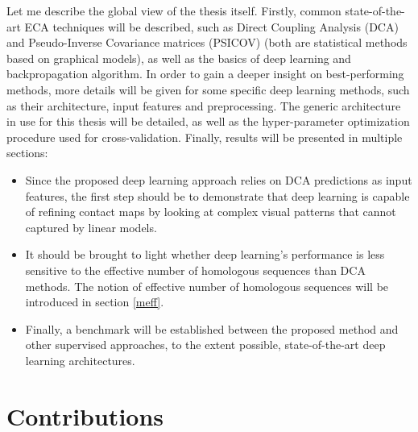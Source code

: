     Let me describe the global view of the thesis itself.
    Firstly, common state-of-the-art ECA techniques will be described, such as Direct Coupling Analysis (DCA)
    and Pseudo-Inverse Covariance matrices (PSICOV) (both are statistical methods based on graphical models),
    as well as the basics of deep learning and backpropagation algorithm.
    In order to gain a deeper insight on best-performing methods, more details will be given for
    some specific deep learning methods, such as their architecture, input features and preprocessing.
    The generic architecture in use for this thesis will be detailed, as well as the hyper-parameter
    optimization procedure used for cross-validation.
    Finally, results will be presented in multiple sections:
    \begin{itemize}
        \item Since the proposed deep learning approach relies on DCA predictions as input features,
        the first step should be to demonstrate that deep learning is capable of refining
        contact maps by looking at complex visual patterns that cannot captured by linear models.
        \item It should be brought to light whether deep learning's performance is less sensitive to the effective
        number of homologous sequences than DCA methods. The notion of effective number of homologous sequences
        will be introduced in section \ref{meff}.
        \item Finally, a benchmark will be established between the proposed method and other supervised approaches,
        to the extent possible, state-of-the-art deep learning architectures.
    \end{itemize}

\section{Contributions}

    \todo{}
